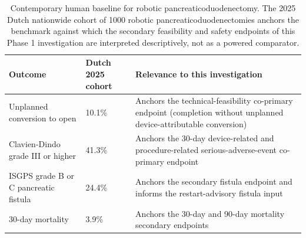 \begin{table}[t]
\caption{Contemporary human baseline for robotic pancreaticoduodenectomy. The 2025
Dutch nationwide cohort of 1000 robotic pancreaticoduodenectomies anchors the
benchmark against which the secondary feasibility and safety endpoints of this
Phase 1 investigation are interpreted descriptively, not as a powered comparator.}
\label{tab:sec02-baseline}
\centering
\begin{tabularx}{\textwidth}{L{4.6cm} C{2.4cm} Y}
\toprule
\textbf{Outcome} & \textbf{Dutch 2025 cohort} & \textbf{Relevance to this investigation} \\
\midrule
Unplanned conversion to open & 10.1\% & Anchors the technical-feasibility co-primary endpoint (completion without unplanned device-attributable conversion) \\
Clavien-Dindo grade III or higher & 41.3\% & Anchors the 30-day device-related and procedure-related serious-adverse-event co-primary endpoint \\
ISGPS grade B or C pancreatic fistula & 24.4\% & Anchors the secondary fistula endpoint and informs the restart-advisory fistula input \\
30-day mortality & 3.9\% & Anchors the 30-day and 90-day mortality secondary endpoints \\
\bottomrule
\end{tabularx}
\end{table}


